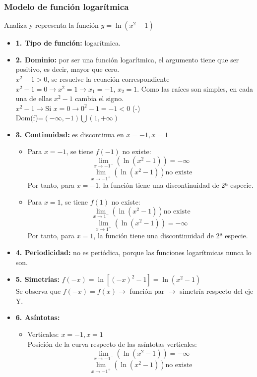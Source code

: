\subsubsection{Modelo de función logarítmica}
Analiza y representa la función $y=\ln (x^2-1)$
\begin{itemize}
	\item \textbf{1. Tipo de función: }logarítmica.
	\item \textbf{2. Dominio: }por ser una función logarítmica, el argumento tiene que ser positivo, es decir, mayor que cero.\\
	$x^2-1 >0$, se resuelve la ecuación correspondiente $x^2-1 = 0 \rightarrow x^2=1 \rightarrow x_1=-1$, $x_2=1$. Como las raíces son simples, en cada una de ellas $x^2-1$ cambia el signo.\\
	$x^2-1 \rightarrow $Si $x=0 \rightarrow 0^2-1 = -1 <0$ (-)\\
	Dom(f)=$(-\infty , -1)\bigcup(1, +\infty)$
	\item \textbf{3. Continuidad: }es discontinua en $x=-1, x=1$
	\begin{itemize}
		\item Para $x=-1$, se tiene $f(-1)$ no existe:\\
		$$\lim_{x \to -1^{-}}(\ln (x^2-1))=-\infty$$
		$$\lim_{x \to -1^{+}}(\ln (x^2-1)) \text{no existe}$$
		Por tanto, para $x=-1$, la función tiene una discontinuidad de 2ª especie.
		\item Para $x=1$, se tiene $f(1)$ no existe:\\
		$$\lim_{x \to 1^{-}}(\ln (x^2-1)) \text{no existe}$$
		$$\lim_{x \to 1^{+}}(\ln (x^2-1))=-\infty$$
		Por tanto, para $x=1$, la función tiene una discontinuidad de 2ª especie.
	\end{itemize}
	\item \textbf{4. Periodicidad: }no es periódica, porque las funciones logarítmicas nunca lo son.
	\item \textbf{5. Simetrías: }$f(-x)= \ln[(-x)^2-1] = \ln(x^2-1)$\\
	Se observa que $f(-x)=f(x) \rightarrow$ función par $\rightarrow$ simetría respecto del eje Y.
	\item \textbf{6. Asíntotas: }
	\begin{itemize}
		\item Verticales: $x=-1, x=1$\\
		Posición de la curva respecto de las asíntotas verticales:
		$$\lim_{x \to -1^{-}}(\ln (x^2-1))=-\infty$$
		$$\lim_{x \to -1^{+}}(\ln (x^2-1)) \text{no existe}$$

\end{itemize}
\end{itemize}

